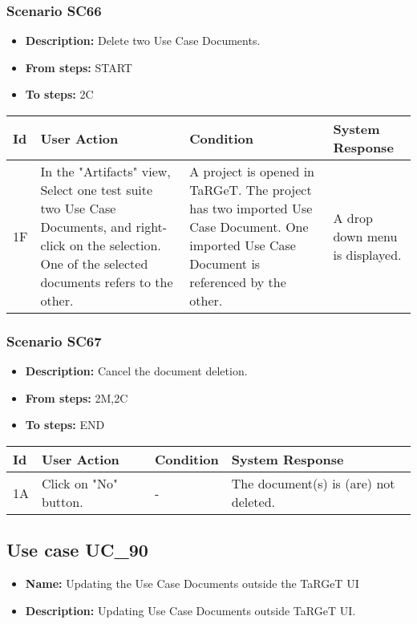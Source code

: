 \documentclass[a4paper,11pt]{article}
\newcommand{\bl}{\\ \hline}
\begin{document}
\subsubsection*{Scenario SC66}
\begin{itemize}
\item {\bf Description:} Delete two Use Case Documents.
\item {\bf From steps:} START
\item {\bf To steps:} 2C
\end{itemize}
\begin{tabular}{|p{0.4in}|p{1.5in}|p{1.5in}|p{1.5in}|}
\hline
Id & User Action & Condition & System Response \bl 
1F & In the "Artifacts" view, Select one test suite two Use Case
						Documents, and right-click on the selection. One of the selected
						documents refers to the other.  & A project is opened in TaRGeT. The project has two
						imported Use Case Document. One imported Use Case Document is
						referenced by the other. & A drop down menu is displayed.\bl
\end{tabular}
\subsubsection*{Scenario SC67}
\begin{itemize}
\item {\bf Description:} Cancel the document deletion.
\item {\bf From steps:} 2M,2C
\item {\bf To steps:} END
\end{itemize}
\begin{tabular}{|p{0.4in}|p{1.5in}|p{1.5in}|p{1.5in}|}
\hline
Id & User Action & Condition & System Response \bl 
1A & Click on "No" button. & - & The document(s) is (are) not deleted.\bl
\end{tabular}
\subsection*{Use case UC_90}
\begin{itemize}
\item {\bf Name: }Updating the Use Case Documents outside the TaRGeT UI
\item {\bf Description: }Updating Use Case Documents outside TaRGeT UI.
			
\end{itemize}
\end{document}
